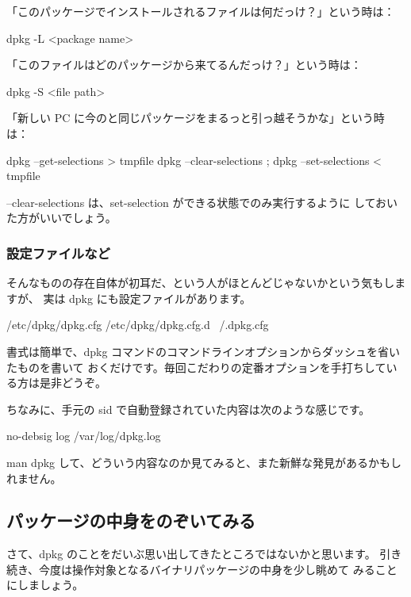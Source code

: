 \documentclass[mingoth,a4paper]{jsarticle}
\begin{document}
「このパッケージでインストールされるファイルは何だっけ？」という時は：
\begin{commandline}
dpkg -L <package name>
\end{commandline}

「このファイルはどのパッケージから来てるんだっけ？」という時は：
\begin{commandline}
dpkg -S <file path>
\end{commandline}

「新しい PC に今のと同じパッケージをまるっと引っ越そうかな」という時は：
\begin{commandline}
dpkg --get-selections > tmpfile
dpkg --clear-selections ; dpkg --set-selections < tmpfile
\end{commandline}

--clear-selections は、set-selection ができる状態でのみ実行するように
しておいた方がいいでしょう。

\subsubsection{設定ファイルなど}

そんなものの存在自体が初耳だ、という人がほとんどじゃないかという気もしますが、
実は dpkg にも設定ファイルがあります。

\begin{commandline}
/etc/dpkg/dpkg.cfg
/etc/dpkg/dpkg.cfg.d
~/.dpkg.cfg
\end{commandline}

書式は簡単で、dpkg コマンドのコマンドラインオプションからダッシュを省いたものを書いて
おくだけです。毎回こだわりの定番オプションを手打ちしている方は是非どうぞ。

ちなみに、手元の sid で自動登録されていた内容は次のような感じです。

\begin{commandline}
no-debsig
log /var/log/dpkg.log
\end{commandline}

man dpkg して、どういう内容なのか見てみると、また新鮮な発見があるかもしれません。

\subsection{パッケージの中身をのぞいてみる}

さて、dpkg のことをだいぶ思い出してきたところではないかと思います。
引き続き、今度は操作対象となるバイナリパッケージの中身を少し眺めて
みることにしましょう。
\end{document}
